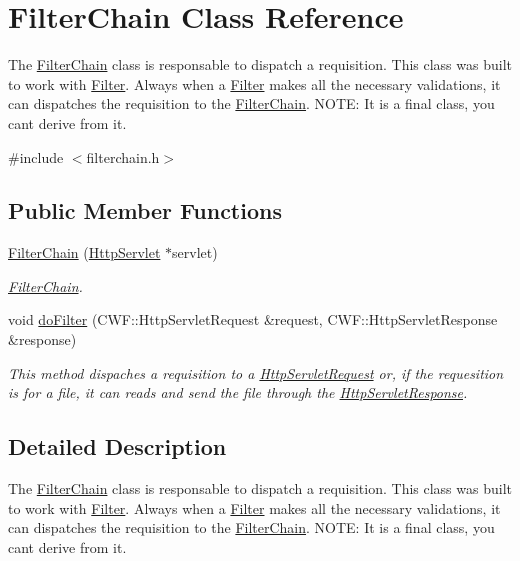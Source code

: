 \hypertarget{class_filter_chain}{}\section{Filter\+Chain Class Reference}
\label{class_filter_chain}


The \mbox{\hyperlink{class_filter_chain}{Filter\+Chain}} class is responsable to dispatch a requisition. This class was built to work with \mbox{\hyperlink{class_filter}{Filter}}. Always when a \mbox{\hyperlink{class_filter}{Filter}} makes all the necessary validations, it can dispatches the requisition to the \mbox{\hyperlink{class_filter_chain}{Filter\+Chain}}. N\+O\+TE\+: It is a final class, you can\textquotesingle{}t derive from it.  




{\ttfamily \#include $<$filterchain.\+h$>$}

\subsection*{Public Member Functions}
\begin{DoxyCompactItemize}
\item 
\mbox{\hyperlink{class_filter_chain_a2631e4de118e5ea95f1f84c55828b526}{Filter\+Chain}} (\mbox{\hyperlink{class_http_servlet}{Http\+Servlet}} $\ast$servlet)
\begin{DoxyCompactList}\small\item\em \mbox{\hyperlink{class_filter_chain}{Filter\+Chain}}. \end{DoxyCompactList}\item 
void \mbox{\hyperlink{class_filter_chain_a2792dc5418eeb0914af046d78f679d51}{do\+Filter}} (C\+W\+F\+::\+Http\+Servlet\+Request \&request, C\+W\+F\+::\+Http\+Servlet\+Response \&response)
\begin{DoxyCompactList}\small\item\em This method dispaches a requisition to a \mbox{\hyperlink{class_http_servlet_request}{Http\+Servlet\+Request}} or, if the requesition is for a file, it can reads and send the file through the \mbox{\hyperlink{class_http_servlet_response}{Http\+Servlet\+Response}}. \end{DoxyCompactList}\end{DoxyCompactItemize}


\subsection{Detailed Description}
The \mbox{\hyperlink{class_filter_chain}{Filter\+Chain}} class is responsable to dispatch a requisition. This class was built to work with \mbox{\hyperlink{class_filter}{Filter}}. Always when a \mbox{\hyperlink{class_filter}{Filter}} makes all the necessary validations, it can dispatches the requisition to the \mbox{\hyperlink{class_filter_chain}{Filter\+Chain}}. N\+O\+TE\+: It is a final class, you can\textquotesingle{}t derive from it. 


